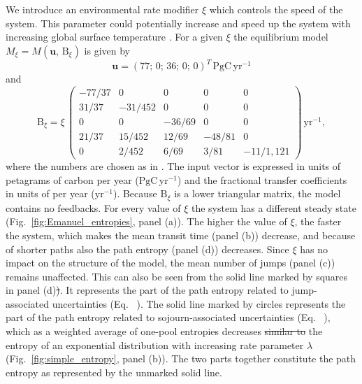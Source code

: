 \documentclass[smallextended]{svjour3}
\makeatletter
\renewcommand*{\eqref}[1]{%
  \hyperref[{#1}]{\textup{\tagform@{\ref*{#1}}}}%
}
\renewcommand{\tens}[1]{\mathrm{#1}}
\renewcommand{\vec}[1]{\mathbf{#1}}
\newcommand{\peta}{\mathrm{P}}
\newcommand{\gC}{\mathrm{gC}}
\newcommand{\yr}{\mathrm{yr}}
\newcommand{\transpose}{T}
\providecommand{\DIFaddtex}[1]{{\protect\color{blue}\uwave{#1}}} %
\providecommand{\DIFdeltex}[1]{{\protect\color{red}\sout{#1}}}                      %
\providecommand{\DIFaddbegin}{} %
\providecommand{\DIFaddend}{} %
\providecommand{\DIFdelbegin}{} %
\providecommand{\DIFdelend}{} %
\providecommand{\DIFadd}[1]{\texorpdfstring{\DIFaddtex{#1}}{#1}} %
\providecommand{\DIFdel}[1]{\texorpdfstring{\DIFdeltex{#1}}{}} %
\newcommand{\DIFscaledelfig}{0.5}
\newlength{\DIFdelgraphicswidth} %
\newlength{\DIFdelgraphicsheight} %
\newcommand{\DIFaddincludegraphics}[2][]{{\color{blue}\fbox{\DIFOincludegraphics[#1]{#2}}}} %
\newcommand{\DIFdelincludegraphics}[2][]{%
\sbox{\DIFdelgraphicsbox}{\DIFOincludegraphics[#1]{#2}}%
\settoboxwidth{\DIFdelgraphicswidth}{\DIFdelgraphicsbox} %
\settoboxtotalheight{\DIFdelgraphicsheight}{\DIFdelgraphicsbox} %
\scalebox{\DIFscaledelfig}{%
\parbox[b]{\DIFdelgraphicswidth}{\usebox{\DIFdelgraphicsbox}\\[-\baselineskip] \rule{\DIFdelgraphicswidth}{0em}}\llap{\resizebox{\DIFdelgraphicswidth}{\DIFdelgraphicsheight}{%
\setlength{\unitlength}{\DIFdelgraphicswidth}%
\begin{picture}(1,1)%
\thicklines\linethickness{2pt} %
{\color[rgb]{1,0,0}\put(0,0){\framebox(1,1){}}}%
{\color[rgb]{1,0,0}\put(0,0){\line( 1,1){1}}}%
{\color[rgb]{1,0,0}\put(0,1){\line(1,-1){1}}}%
\end{picture}%
}\hspace*{3pt}}} %
} %
\DeclareRobustCommand{\DIFaddbegin}{\DIFOaddbegin \let\includegraphics\DIFaddincludegraphics} %
\DeclareRobustCommand{\DIFaddend}{\DIFOaddend \let\includegraphics\DIFOincludegraphics} %
\DeclareRobustCommand{\DIFdelbegin}{\DIFOdelbegin \let\includegraphics\DIFdelincludegraphics} %
\DeclareRobustCommand{\DIFdelend}{\DIFOaddend \let\includegraphics\DIFOincludegraphics} %
\makeatother
\begin{document}
We introduce an environmental rate modifier $\xi$ which controls the speed of the system.
This parameter could potentially increase and speed up the system with increasing global surface temperature \DIFaddbegin \DIFadd{\mbox{%
\citep{Sierra2023PTRS}}\hspace{0pt}%
}\DIFaddend .
For a given $\xi$ the equilibrium model $M_\xi=M(\vec{u},\,\tens{B}_\xi)$ is given by
\begin{equation}
  \vec{u} = (77;\,0;\,36;\,0;\,0)^{\transpose}\, \peta\gC\,\yr^{-1}
\end{equation}
and
\begin{equation}
    \tens{B}_\xi = \xi\,\left(\begin{matrix}
      -77/37 &       0 &      0 &      0 & 	  0\\
       31/37 & -31/452 &      0 &      0 & 	  0\\
	   0 &       0 & -36/69 &      0 & 	  0\\
       21/37 &  15/452 &  12/69 & -48/81 & 	  0\\
	   0 &   2/452 &   6/69 &   3/81 & -11/1,121
	 \end{matrix}\right)\,\yr^{-1},
\end{equation}
where the numbers are chosen as in \citet{Thompson1999GCB}. 
The input vector is expressed in units of petagrams of carbon per year ($\peta\gC\,\yr^{-1}$) and the fractional transfer coefficients in units of per year ($\yr^{-1}$).
Because $\tens{B}_\xi$ is a lower triangular matrix, the model contains no feedbacks.
For every value of $\xi$ the system has a different steady state (Fig.~\ref{fig:Emanuel_entropies}, panel (a)).
The higher the value of $\xi$, the faster the system, which makes the mean transit time (panel (b)) decrease, and because of shorter paths also the path entropy (panel (d)) decreases.
Since $\xi$ has no impact on the structure of the model, the mean number of jumps (panel (c)) remains unaffected.
This can also be seen from the solid line marked by squares in panel (d)\DIFdelbegin \DIFdel{)}\DIFdelend .
It represents the part of the path entropy related to jump-associated uncertainties (Eq.~\eqref{eqn:H_discrete}).
The solid line marked by circles represents the part of the path entropy related to sojourn-associated uncertainties (Eq.~\eqref{eqn:H_continuous}), which as a weighted average of one-pool entropies decreases \DIFdelbegin \DIFdel{similar to }\DIFdelend \DIFaddbegin \DIFadd{similarly as }\DIFaddend the entropy of an exponential distribution with increasing rate parameter $\lambda$ (Fig.~\ref{fig:simple_entropy}, panel (b)).
The two parts together constitute the path entropy as represented by the unmarked solid line.
\end{document}
